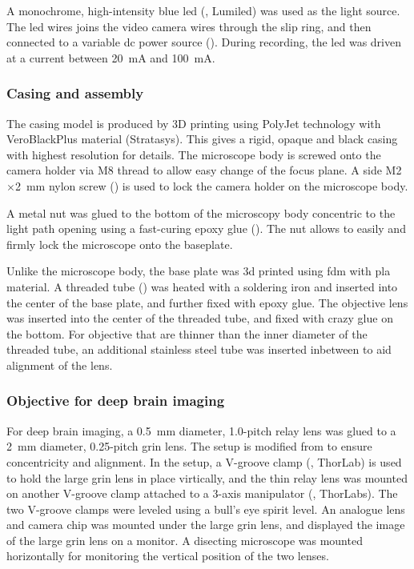 A monochrome, high-intensity blue \gls{led} (, Lumiled) was used as the light source. The \gls{led} wires joins the video camera wires through the slip ring, and then connected to a variable \gls{dc} power source (). During recording, the \gls{led} was driven at a current between \SI{20}{\mA} and \SI{100}{\mA}.

\subsubsection{Casing and assembly}
The casing model is produced by 3D printing using PolyJet technology with VeroBlackPlus material (Stratasys). This gives a rigid, opaque and black casing with highest resolution for details. The microscope body is screwed onto the camera holder via M8 thread to allow easy change of the focus plane. A side M2$\times$\SI{2}{\mm} nylon screw () is used to lock the camera holder on the microscope body.

A metal nut  was glued to the bottom of the microscopy body concentric to the light path opening using a fast-curing epoxy glue (). The nut allows to easily and firmly lock the microscope onto the baseplate.

Unlike the microscope body, the base plate was 3d printed using \gls{fdm} with \gls{pla} material. A threaded tube () was heated with a soldering iron and inserted into the center of the base plate, and further fixed with epoxy glue. The objective lens was inserted into the center of the threaded tube, and fixed with crazy glue on the bottom. For objective that are thinner than the inner diameter of the threaded tube, an additional stainless steel tube was inserted inbetween to aid alignment of the lens.

\subsubsection{Objective for deep brain imaging} \label{objective assembly}

For deep brain imaging, a \SI{0.5}{\mm} diameter, 1.0-pitch relay lens was glued to a \SI{2}{\mm} diameter, 0.25-pitch \gls{grin} lens. The setup is modified from \citep{kim12} to ensure concentricity and alignment. In the setup, a V-groove clamp (, ThorLab) is used to hold the large \gls{grin} lens in place virtically, and the thin relay lens was mounted on another V-groove clamp attached to a 3-axis manipulator (, ThorLabs). The two V-groove clamps were leveled using a bull's eye spirit level. An analogue lens and camera chip was mounted under the large \gls{grin} lens, and displayed the image of the large \gls{grin} lens on a monitor. A disecting microscope was mounted horizontally for monitoring the vertical position of the two lenses. 

